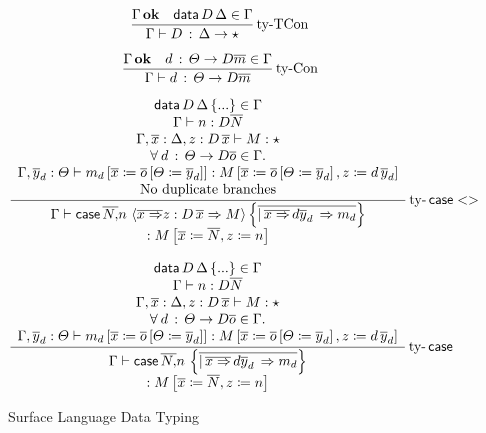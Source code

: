 \begin{figure}
\[
\frac{\Gamma\,\mathbf{ok}\quad\mathsf{data}\,D\,\Delta\in\Gamma}{\Gamma\vdash D\,:\,\Delta\rightarrow\star}\operatorname{ty-TCon}
\]

\[
\frac{\Gamma\,\mathbf{ok}\quad d\,:\,\varTheta\rightarrow D\overline{m}\in\Gamma}{\Gamma\vdash d\,:\,\varTheta\rightarrow D\overline{m}}\operatorname{ty-Con}
\]

\[
\frac{\begin{array}{c}
\mathsf{data}\,D\,\Delta\left\{ ...\right\} \in\Gamma\\
\Gamma\vdash n:D\overline{N}\\
\Gamma,\overline{x}:\Delta,z:D\,\overline{x}\vdash M:\star\\
\forall\:d\,:\,\varTheta\rightarrow D\overline{o}\in\Gamma.\\
\Gamma,\overline{y}_{d}:\varTheta\vdash m_{d}\left[\overline{x}\coloneqq\overline{o}\left[\varTheta\coloneqq\overline{y}_{d}\right]\right]:M\left[\overline{x}\coloneqq\overline{o}\left[\varTheta\coloneqq\overline{y}_{d}\right],z\coloneqq d\,\overline{y}_{d}\right]\\
\mathrm{No\ duplicate\ branches}
\end{array}}{\begin{array}{c}
\Gamma\vdash\mathsf{case}\,\overline{N,}n\,\left\langle \overline{x\Rightarrow}z:D\,\overline{x}\Rightarrow M\right\rangle \left\{ \overline{|\,\overline{x\Rightarrow}\,d\overline{y}_{d}\,\Rightarrow m_{d}}\right\} \\
:M\left[\overline{x}\coloneqq\overline{N},z\coloneqq n\right]
\end{array}}\operatorname{ty-}\mathsf{case}<>
\]

\[
\frac{\begin{array}{c}
\mathsf{data}\,D\,\Delta\left\{ ...\right\} \in\Gamma\\
\Gamma\vdash n:D\overline{N}\\
\Gamma,\overline{x}:\Delta,z:D\,\overline{x}\vdash M:\star\\
\forall\:d\,:\,\varTheta\rightarrow D\overline{o}\in\Gamma.\\
\Gamma,\overline{y}_{d}:\varTheta\vdash m_{d}\left[\overline{x}\coloneqq\overline{o}\left[\varTheta\coloneqq\overline{y}_{d}\right]\right]:M\left[\overline{x}\coloneqq\overline{o}\left[\varTheta\coloneqq\overline{y}_{d}\right],z\coloneqq d\,\overline{y}_{d}\right]
\end{array}}{\begin{array}{c}
\Gamma\vdash\mathsf{case}\,\overline{N,}n\,\left\{ \overline{|\,\overline{x\Rightarrow}\,d\overline{y}_{d}\,\Rightarrow m_{d}}\right\} \\
:M\left[\overline{x}\coloneqq\overline{N},z\coloneqq n\right]
\end{array}}\operatorname{ty-}\mathsf{case}
\]

\caption{Surface Language Data Typing}
\label{fig:surface-data-ty}
\end{figure}

